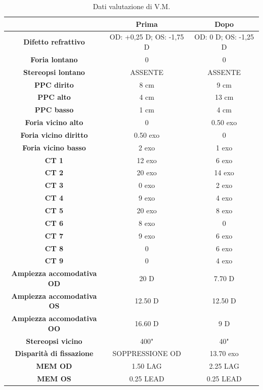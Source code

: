 \begin{table}[H]
\begin{center}
\begin{tabular}{|c|c|c|} \hline
{\textbf{}} & {\textbf{Prima}} & {\textbf{Dopo}}\\ \hline
\textbf{Difetto refrattivo} & OD: +0,25 D; OS: -1,75 D & OD: 0 D; OS: -1,25 D \\ \hline
\textbf{Foria lontano} & 0 & 0\\ \hline
\textbf{Stereopsi lontano} & ASSENTE & ASSENTE \\ \hline
\textbf{PPC dirito} & 8 cm & 9 cm \\ \hline
\textbf{PPC alto} & 4 cm & 13 cm \\ \hline
\textbf{PPC basso} & 1 cm & 4 cm \\ \hline
\textbf{Foria vicino alto} & 0 & 0.50 exo \\ \hline
\textbf{Foria vicino diritto} & 0.50 exo & 0 \\ \hline
\textbf{Foria vicino basso} & 2 exo & 1 exo \\ \hline
\textbf{CT 1} & 12 exo & 6 exo \\ \hline
\textbf{CT 2} & 20 exo & 14 exo \\ \hline
\textbf{CT 3} & 0 exo & 2 exo \\ \hline
\textbf{CT 4} & 9 exo & 4 exo \\ \hline
\textbf{CT 5} & 20 exo & 8 exo \\ \hline
\textbf{CT 6} & 8 exo & 0 \\ \hline
\textbf{CT 7} & 9 exo & 6 exo \\ \hline
\textbf{CT 8} & 0 & 6 exo \\ \hline
\textbf{CT 9} & 0 & 4 exo \\ \hline
\textbf{Ampiezza accomodativa OD} & 20 D & 7.70 D \\ \hline
\textbf{Ampiezza accomodativa OS} & 12.50 D & 12.50 D \\ \hline
\textbf{Ampiezza accomodativa OO} & 16.60 D & 9 D \\ \hline
\textbf{Stereopsi vicino} & 400" & 40" \\ \hline
\textbf{Disparità di fissazione} & SOPPRESSIONE OD & 13.70 exo \\ \hline
\textbf{MEM OD} & 1.50 LAG & 2.25 LAG \\ \hline
\textbf{MEM OS} & 0.25 LEAD & 0.25 LEAD \\ \hline

\hline
\end{tabular}
\end{center}
\caption{Dati valutazione di V.M.}
\end{table}

